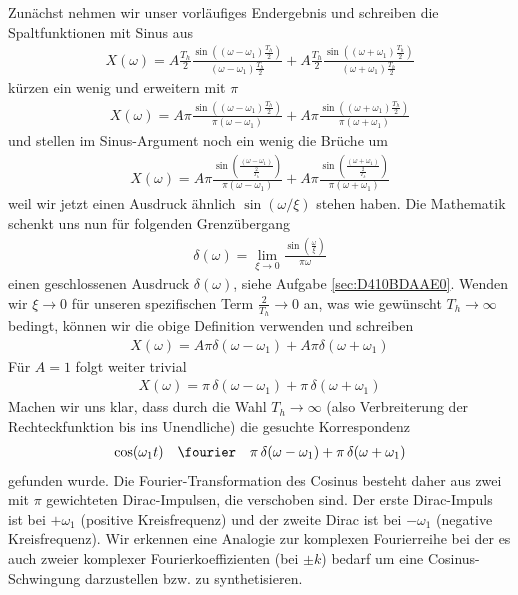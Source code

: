 \begin{mdframed}
%
Zunächst nehmen wir unser vorläufiges Endergebnis und schreiben die Spaltfunktionen mit Sinus
aus
\begin{align}
X(\omega) =
A \frac{T_h}{2} \frac{\sin\left((\omega-\omega_1) \frac{T_h}{2}\right)}{(\omega-\omega_1) \frac{T_h}{2}} +
A \frac{T_h}{2} \frac{\sin\left((\omega+\omega_1) \frac{T_h}{2}\right)}{(\omega+\omega_1) \frac{T_h}{2}}
\end{align}
kürzen ein wenig und erweitern mit $\pi$
\begin{align}
X(\omega) =
A \pi \frac{\sin\left((\omega-\omega_1) \frac{T_h}{2}\right)}{\pi (\omega-\omega_1)} +
A \pi \frac{\sin\left((\omega+\omega_1) \frac{T_h}{2}\right)}{\pi (\omega+\omega_1)}
\end{align}
und stellen im Sinus-Argument noch ein wenig die Brüche um
\begin{align}
X(\omega) =
A \pi \frac{\sin\left( \frac{(\omega-\omega_1)}{\frac{2}{T_h}}  \right)}{\pi (\omega-\omega_1)} +
A \pi \frac{\sin\left( \frac{(\omega+\omega_1)}{\frac{2}{T_h}}  \right)}{\pi (\omega+\omega_1)}
\end{align}
weil wir jetzt einen Ausdruck ähnlich $\sin(\omega / \xi)$ stehen haben.
%
Die Mathematik schenkt uns nun für folgenden Grenzübergang
\begin{align}
\delta(\omega) = \lim_{\xi\to 0} \frac{\sin(\frac{\omega}{\xi})}{\pi \omega}
\end{align}
einen geschlossenen Ausdruck $\delta(\omega)$, siehe Aufgabe \ref{sec:D410BDAAE0}.
%
Wenden wir $\xi\to 0$ für unseren spezifischen Term $\frac{2}{T_h}\to 0$ an,
was wie gewünscht $T_h\to \infty$ bedingt,
können wir die obige Definition verwenden und schreiben
\begin{align}
X(\omega) = A \pi \delta(\omega-\omega_1) + A \pi \delta(\omega+\omega_1)
\end{align}
%
Für $A=1$ folgt weiter trivial
\begin{align}
X(\omega) = \pi \, \delta(\omega-\omega_1) + \pi \, \delta(\omega+\omega_1)
\end{align}
%
Machen wir uns klar, dass durch die Wahl $T_h\to \infty$ (also Verbreiterung
der Rechteckfunktion bis ins Unendliche) die gesuchte Korrespondenz
\begin{align}
\cos(\omega_1 t) \quad\fourier\quad \pi \, \delta(\omega-\omega_1) + \pi \, \delta(\omega+\omega_1)
\end{align}
gefunden wurde.
%
Die Fourier-Transformation des Cosinus besteht daher aus zwei mit $\pi$ gewichteten
Dirac-Impulsen, die verschoben sind. Der erste Dirac-Impuls ist bei $+\omega_1$
(positive Kreisfrequenz) und der zweite Dirac ist bei $-\omega_1$
(negative Kreisfrequenz).
%
Wir erkennen eine Analogie zur komplexen Fourierreihe bei der es auch zweier
komplexer Fourierkoeffizienten (bei $\pm k$) bedarf um eine Cosinus-Schwingung
darzustellen bzw. zu synthetisieren.
%
\end{mdframed}





